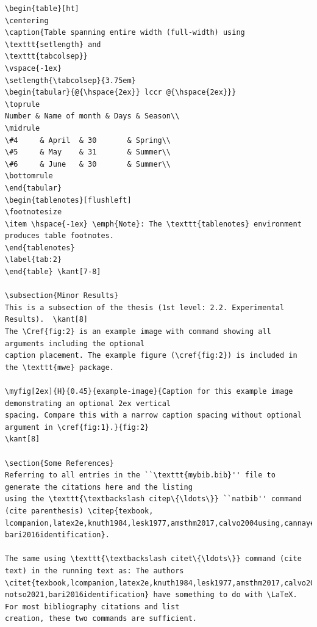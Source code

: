 \documentclass{article}
\begin{document}
{\begin{verbatim}
\begin{table}[ht]
\centering
\caption{Table spanning entire width (full-width) using \texttt{setlength} and
\texttt{tabcolsep}}
\vspace{-1ex}
\setlength{\tabcolsep}{3.75em}
\begin{tabular}{@{\hspace{2ex}} lccr @{\hspace{2ex}}}
\toprule
Number & Name of month & Days & Season\\
\midrule
\#4 	& April  & 30		& Spring\\
\#5 	& May    & 31		& Summer\\
\#6 	& June   & 30		& Summer\\
\bottomrule
\end{tabular}
\begin{tablenotes}[flushleft]
\footnotesize
\item \hspace{-1ex} \emph{Note}: The \texttt{tablenotes} environment produces table footnotes. 
\end{tablenotes}
\label{tab:2}
\end{table}	\kant[7-8]

\subsection{Minor Results}
This is a subsection of the thesis (1st level: 2.2. Experimental Results). 	\kant[8]
The \Cref{fig:2} is an example image with command showing all arguments including the optional 
caption placement. The example figure (\cref{fig:2}) is included in the \texttt{mwe} package.

\myfig[2ex]{H}{0.45}{example-image}{Caption for this example image demonstrating an optional 2ex vertical 
spacing. Compare this with a narrow caption spacing without optional argument in \cref{fig:1}.}{fig:2}    
\kant[8]

\section{Some References}
Referring to all entries in the ``\texttt{mybib.bib}'' file to generate the citations here and the listing 
using the \texttt{\textbackslash citep\{\ldots\}} ``natbib'' command (cite parenthesis) \citep{texbook,
lcompanion,latex2e,knuth1984,lesk1977,amsthm2017,calvo2004using,cannayen2011latex,kopka2004guide,notso2021,
bari2016identification}.

The same using \texttt{\textbackslash citet\{\ldots\}} command (cite text) in the running text as: The authors 
\citet{texbook,lcompanion,latex2e,knuth1984,lesk1977,amsthm2017,calvo2004using,cannayen2011latex,kopka2004guide,
notso2021,bari2016identification} have something to do with \LaTeX. For most bibliography citations and list 
creation, these two commands are sufficient.


\end{verbatim}}
\end{document}
